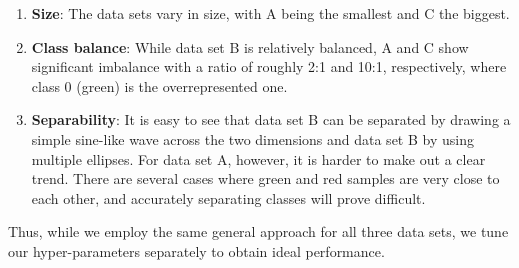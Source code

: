 \documentclass[acmsmall,nonacm]{acmart}
\begin{document}
\begin{enumerate}
	\item \textbf{Size}: The data sets vary in size, with A being the smallest and C the biggest.
	\item \textbf{Class balance}: While data set B is relatively balanced, A and C show significant imbalance with a ratio of roughly 2:1 and 10:1, respectively, where class 0 (green) is the overrepresented one.
	\item \textbf{Separability}: It is easy to see that data set B can be separated by drawing a simple sine-like wave across the two dimensions and data set B by using multiple ellipses. For data set A, however, it is harder to make out a clear trend. There are several cases where green and red samples are very close to each other, and accurately separating classes will prove difficult.
\end{enumerate}

Thus, while we employ the same general approach for all three data sets, we tune our hyper-parameters separately to obtain ideal performance.
\end{document}
